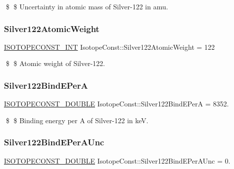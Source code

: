 \$ \$ Uncertainty in atomic mass of Silver-\/122 in amu. \mbox{\label{group___isotope_const-_silver-_ag122_ga49cf62c5e7ffe343f057d7b5a113df96}} 
\subsubsection{\texorpdfstring{Silver122\+Atomic\+Weight}{Silver122AtomicWeight}}
{\footnotesize\ttfamily \mbox{\hyperlink{group___isotope_const-_macros_ga5f18360b3e99483a35c32d789e62621c}{I\+S\+O\+T\+O\+P\+E\+C\+O\+N\+S\+T\+\_\+\+I\+NT}} Isotope\+Const\+::\+Silver122\+Atomic\+Weight = 122}

\$ \$ Atomic weight of Silver-\/122. \mbox{\label{group___isotope_const-_silver-_ag122_gacd432b7cc7384d4b6045ea495d1b3286}} 
\subsubsection{\texorpdfstring{Silver122\+Bind\+E\+PerA}{Silver122BindEPerA}}
{\footnotesize\ttfamily \mbox{\hyperlink{group___isotope_const-_macros_ga8f45a7272ce02c0b4c65c44636ed719a}{I\+S\+O\+T\+O\+P\+E\+C\+O\+N\+S\+T\+\_\+\+D\+O\+U\+B\+LE}} Isotope\+Const\+::\+Silver122\+Bind\+E\+PerA = 8352.}

\$ \$ Binding energy per A of Silver-\/122 in keV. \mbox{\label{group___isotope_const-_silver-_ag122_ga6892239eaf8fe50cc0a0b7bc9d76daa5}} 
\subsubsection{\texorpdfstring{Silver122\+Bind\+E\+Per\+A\+Unc}{Silver122BindEPerAUnc}}
{\footnotesize\ttfamily \mbox{\hyperlink{group___isotope_const-_macros_ga8f45a7272ce02c0b4c65c44636ed719a}{I\+S\+O\+T\+O\+P\+E\+C\+O\+N\+S\+T\+\_\+\+D\+O\+U\+B\+LE}} Isotope\+Const\+::\+Silver122\+Bind\+E\+Per\+A\+Unc = 0.}

